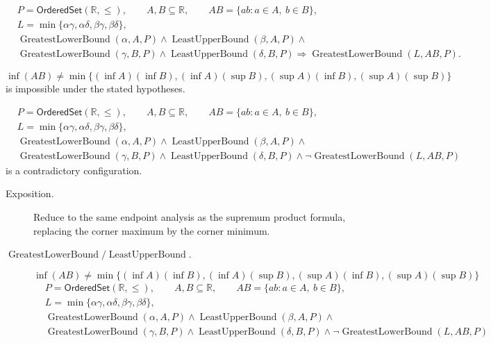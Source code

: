 \begin{remark*}
\[
\begin{aligned}
&P=\mathsf{OrderedSet}(\mathbb{R},\leq),\qquad
A,B\subseteq\mathbb{R},\qquad AB=\{ab:a\in A,\ b\in B\},\\
&L=\min\{\alpha\gamma,\alpha\delta,\beta\gamma,\beta\delta\},\\
&\operatorname{GreatestLowerBound}(\alpha,A,P)\land
\operatorname{LeastUpperBound}(\beta,A,P)\land\\
&\operatorname{GreatestLowerBound}(\gamma,B,P)\land
\operatorname{LeastUpperBound}(\delta,B,P)
\Longrightarrow
\operatorname{GreatestLowerBound}(L,AB,P).
\end{aligned}
\]
\end{remark*}

\begin{remark*}
\[
\inf(AB)\neq
\min\{(\inf A)(\inf B),(\inf A)(\sup B),(\sup A)(\inf B),(\sup A)(\sup B)\}
\]
is impossible under the stated hypotheses.
\end{remark*}

\begin{remark*}
\[
\begin{aligned}
&P=\mathsf{OrderedSet}(\mathbb{R},\leq),\qquad
A,B\subseteq\mathbb{R},\qquad AB=\{ab:a\in A,\ b\in B\},\\
&L=\min\{\alpha\gamma,\alpha\delta,\beta\gamma,\beta\delta\},\\
&\operatorname{GreatestLowerBound}(\alpha,A,P)\land
\operatorname{LeastUpperBound}(\beta,A,P)\land\\
&\operatorname{GreatestLowerBound}(\gamma,B,P)\land
\operatorname{LeastUpperBound}(\delta,B,P)\land
\neg\operatorname{GreatestLowerBound}(L,AB,P)
\end{aligned}
\]
is a contradictory configuration.
\end{remark*}

\begin{remark*}
\begin{description}
  \item[Exposition.]
Reduce to the same endpoint analysis as the supremum product formula, replacing
the corner maximum by the corner minimum.


  \item[\(\operatorname{GreatestLowerBound} / \operatorname{LeastUpperBound}.\)]
  \[
\inf(AB)\neq
\min\{(\inf A)(\inf B),(\inf A)(\sup B),(\sup A)(\inf B),(\sup A)(\sup B)\}
\]
\[
\begin{aligned}
&P=\mathsf{OrderedSet}(\mathbb{R},\leq),\qquad
A,B\subseteq\mathbb{R},\qquad AB=\{ab:a\in A,\ b\in B\},\\
&L=\min\{\alpha\gamma,\alpha\delta,\beta\gamma,\beta\delta\},\\
&\operatorname{GreatestLowerBound}(\alpha,A,P)\land
\operatorname{LeastUpperBound}(\beta,A,P)\land\\
&\operatorname{GreatestLowerBound}(\gamma,B,P)\land
\operatorname{LeastUpperBound}(\delta,B,P)\land
\neg\operatorname{GreatestLowerBound}(L,AB,P)
\end{aligned}
\]
\end{description}
\end{remark*}

